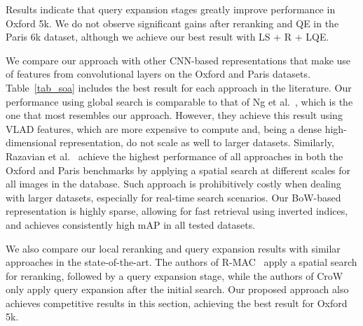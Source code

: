 \documentclass{sig-arxiv}
\begin{document}
Results indicate that query expansion stages greatly improve performance in Oxford 5k. We do not observe significant gains after reranking and QE in the Paris 6k dataset, although we achieve our best result with LS + R + LQE.


We compare our approach with other CNN-based representations that make use of features from convolutional layers on the Oxford and Paris datasets. Table~\ref{tab_soa} includes the best result for each approach in the literature. Our performance using global search is comparable to that of Ng et al.~\cite{ng2015}, which is the one that most resembles our approach. However, they achieve this result using VLAD features, which are more expensive to compute and, being a dense high-dimensional representation, do not scale as well to larger datasets. Similarly, Razavian et al.~\cite{razavian2015} achieve the highest performance of all approaches in both the Oxford and Paris benchmarks by applying a spatial search at different scales for all images in the database. Such approach is prohibitively costly when dealing with larger datasets, especially for real-time search scenarios. Our BoW-based representation is highly sparse, allowing for fast retrieval using inverted indices, and achieves consistently high mAP in all tested datasets. 


We also compare our local reranking and query expansion results with similar approaches in the state-of-the-art. The authors of R-MAC~\cite{tolias2015} apply a spatial search for reranking, followed by a query expansion stage, while the authors of CroW~\cite{kalantidis2015} only apply query expansion after the initial search. Our proposed approach also achieves competitive results in this section, achieving the best result for Oxford 5k.
\end{document}
